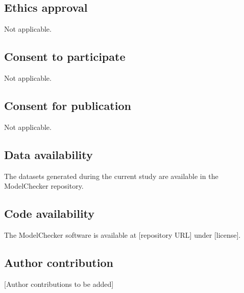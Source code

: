 \documentclass[pdflatex,sn-mathphys-num]{sn-jnl}
\theoremstyle{thmstyleone}
\theoremstyle{thmstyletwo}
\theoremstyle{thmstylethree}
\begin{document}
\subsection*{Ethics approval}
Not applicable.

\subsection*{Consent to participate}
Not applicable.

\subsection*{Consent for publication}
Not applicable.

\subsection*{Data availability}
The datasets generated during the current study are available in the ModelChecker repository.

\subsection*{Code availability}
The ModelChecker software is available at [repository URL] under [license].

\subsection*{Author contribution}
[Author contributions to be added]





\end{document}
